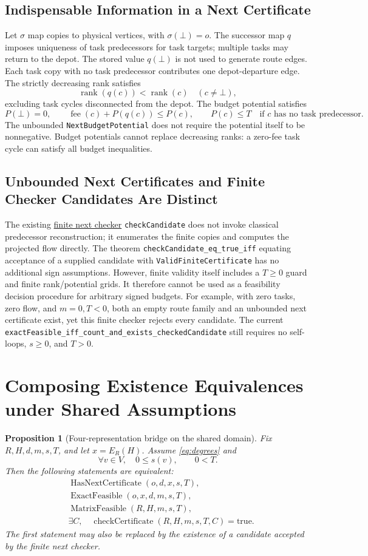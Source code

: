 \documentclass[11pt]{article}
\newtheorem{proposition}{Proposition}[section]
\theoremstyle{remark}
\newcommand{\EF}{\operatorname{ExactFeasible}}
\newcommand{\MF}{\operatorname{MatrixFeasible}}
\newcommand{\NC}{\operatorname{HasNextCertificate}}
\newcommand{\CC}{\operatorname{checkCertificate}}
\newcommand{\code}[1]{\nolinkurl{#1}}
\newcommand{\src}[2]{\href{https://github.com/huam54925-cpu/uav-routing-certification/blob/1bc992475a9bd515d77245e2bc0471e5ecab2fd5/LeanCompletion/UAV/#1.lean}{#2}}
\begin{document}
\subsection{Indispensable Information in a Next Certificate}
Let $\sigma$ map copies to physical vertices, with $\sigma(\bot)=o$.
The successor map $q$ imposes uniqueness of task predecessors for task targets; multiple tasks may return to the depot.
The stored value $q(\bot)$ is not used to generate route edges.
Each task copy with no task predecessor contributes one depot-departure edge.
The strictly decreasing rank satisfies
\[
 \operatorname{rank}(q(c))<\operatorname{rank}(c)\quad(c\neq\bot),
\]
excluding task cycles disconnected from the depot. The budget potential satisfies
\[
 P(\bot)=0,\qquad
 \operatorname{fee}(c)+P(q(c))\leq P(c),\qquad
 P(c)\leq T\quad\text{if $c$ has no task predecessor}.
\]
The unbounded \code{NextBudgetPotential} does not require the potential itself to be nonnegative.
Budget potentials cannot replace decreasing ranks: a zero-fee task cycle can satisfy all budget inequalities.

\subsection{Unbounded Next Certificates and Finite Checker Candidates Are Distinct}
The existing \src{LocalVisitPairingFiniteChecker}{finite next checker}
\code{checkCandidate} does not invoke classical predecessor reconstruction; it enumerates the finite copies and computes the projected flow directly.
The theorem \code{checkCandidate_eq_true_iff} equating acceptance of a supplied candidate with
\code{ValidFiniteCertificate} has no additional sign assumptions.
However, finite validity itself includes a $T\geq0$ guard and finite rank/potential grids.
It therefore cannot be used as a feasibility decision procedure for arbitrary signed budgets.
For example, with zero tasks, zero flow, and $m=0,T<0$, both an empty route family and an unbounded next certificate exist,
yet this finite checker rejects every candidate.
The current \code{exactFeasible_iff_count_and_exists_checkedCandidate}
still requires no self-loops, $s\geq0$, and $T>0$.

\section{Composing Existence Equivalences under Shared Assumptions}

\begin{proposition}[Four-representation bridge on the shared domain]\label{prop:bridge}
Fix $R,H,d,m,s,T$, and let $x=E_R(H)$.
Assume \eqref{eq:degrees} and
\[
 \forall v\in V,\quad 0\leq s(v),\qquad 0<T.
\]
Then the following statements are equivalent:
\begin{align*}
 &\NC(o,d,x,s,T),\\
 &\EF(o,x,d,m,s,T),\\
 &\MF(R,H,m,s,T),\\
 &\exists C,\quad \CC(R,H,m,s,T,C)=\mathrm{true}.
\end{align*}
The first statement may also be replaced by the existence of a candidate accepted by the finite next checker.
\end{proposition}
\end{document}
